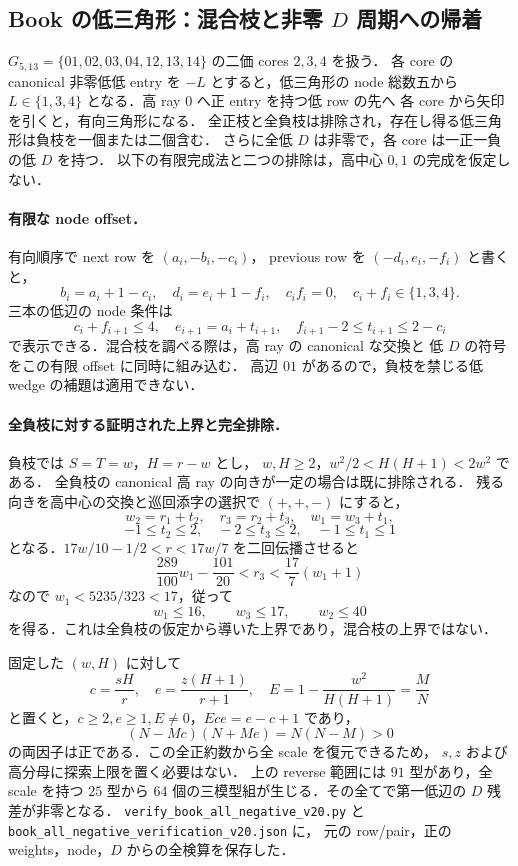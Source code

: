 \subsection{Book の低三角形：混合枝と非零 \texorpdfstring{$D$}{D} 周期への帰着}
\label{nb20:section}

$G_{5,13}=\{01,02,03,04,12,13,14\}$ の二価 cores $2,3,4$ を扱う．
各 core の canonical 非零低低 entry を $-L$ とすると，低三角形の node 総数五から
$L\in\{1,3,4\}$ となる．高 ray $0$ へ正 entry を持つ低 row の先へ
各 core から矢印を引くと，有向三角形になる．
全正枝と全負枝は排除され，存在し得る低三角形は負枝を一個または二個含む．
さらに全低 $D$ は非零で，各 core は一正一負の低 $D$ を持つ．
以下の有限完成法と二つの排除は，高中心 $0,1$ の完成を仮定しない．

\paragraph{有限な node offset．}
有向順序で next row を $(a_i,-b_i,-c_i)$，
previous row を $(-d_i,e_i,-f_i)$ と書くと，
\[
 b_i=a_i+1-c_i,\quad d_i=e_i+1-f_i,\quad
 c_if_i=0,\quad c_i+f_i\in\{1,3,4\}.
\]
三本の低辺の node 条件は
\[
 c_i+f_{i+1}\le4,\quad e_{i+1}=a_i+t_{i+1},\quad
 f_{i+1}-2\le t_{i+1}\le2-c_i
\]
で表示できる．混合枝を調べる際は，高 ray の canonical な交換と
低 $D$ の符号をこの有限 offset に同時に組み込む．
高辺 $01$ があるので，負枝を禁じる低 wedge の補題は適用できない．

\paragraph{全負枝に対する証明された上界と完全排除．}
負枝では $S=T=w$，$H=r-w$ とし，
$w,H\ge2$，$w^2/2<H(H+1)<2w^2$ である．
全負枝の canonical 高 ray の向きが一定の場合は既に排除される．
残る向きを高中心の交換と巡回添字の選択で $(+,+,-)$ にすると，
\[
 w_2=r_1+t_2,\quad r_3=r_2+t_3,\quad w_1=w_3+t_1,
\]
\[
 -1\le t_2\le2,\quad -2\le t_3\le2,\quad -1\le t_1\le1
\]
となる．$17w/10-1/2<r<17w/7$ を二回伝播させると
\[
 \frac{289}{100}w_1-\frac{101}{20}<r_3
 <\frac{17}{7}(w_1+1)
\]
なので $w_1<5235/323<17$，従って
\[
 w_1\le16,\qquad w_3\le17,\qquad w_2\le40
\]
を得る．これは全負枝の仮定から導いた上界であり，混合枝の上界ではない．

固定した $(w,H)$ に対して
\[
 c=\frac{sH}{r},\quad e=\frac{z(H+1)}{r+1},\quad
 E=1-\frac{w^2}{H(H+1)}=\frac MN
\]
と置くと，$c\ge2,e\ge1,E\ne0$，$Ece=e-c+1$ であり，
\[
 (N-Mc)(N+Me)=N(N-M)>0
\]
の両因子は正である．この全正約数から全 scale を復元できるため，
$s,z$ および高分母に探索上限を置く必要はない．
上の reverse 範囲には $91$ 型があり，全 scale を持つ $25$ 型から
$64$ 個の三模型組が生じる．その全てで第一低辺の $D$ 残差が非零となる．
\nolinkurl{verify_book_all_negative_v20.py} と
\nolinkurl{book_all_negative_verification_v20.json} に，
元の row/pair，正の weights，node，$D$ からの全検算を保存した．

